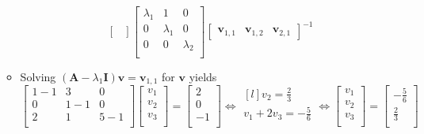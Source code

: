\documentclass[12pt,a4paper]{article}
\begin{document}
\begin{itemize}
\begin{itemize}
\begin{enumerate}
\begin{equation}
\begin{bmatrix}
        \end{bmatrix}
        \begin{bmatrix}
          \lambda_{1} & 1 & 0 \\
          0 & \lambda_{1} & 0 \\
          0 & 0 & \lambda_{2} \\
        \end{bmatrix}
        \begin{bmatrix}
          \bm{v}_{1,1} & \bm{v}_{1,2} & \bm{v}_{2,1}
        \end{bmatrix}^{-1}
      \end{equation}
    \end{enumerate}
  \item Solving $(\bm{A}-\lambda_{1}\bm{I})\bm{v} = \bm{v}_{1,1}$ for $\bm{v}$ yields
    \begin{equation}\nonumber%
      \begin{bmatrix}
        1-1 & 3 & 0 \\
        0 & 1-1 & 0 \\
        2 & 1 & 5-1 \\
      \end{bmatrix}
      \begin{bmatrix}
        v_{1} \\
        v_{2} \\
        v_{3} \\
      \end{bmatrix}
      =
      \begin{bmatrix}
        2 \\
        0 \\
        -1 \\
      \end{bmatrix}
      \iff
      \begin{matrix*}[l]
        v_{2} = \frac{2}{3}  \\
        v_{1} + 2v_{3} = - \frac{5}{6} \\
      \end{matrix*}
      \iff
      \begin{bmatrix}
        v_{1} \\
        v_{2} \\
        v_{3} \\
      \end{bmatrix}
      =
      \begin{bmatrix}
        - \frac{5}{6} \\
        \frac{2}{3} \\

\end{bmatrix}
\end{equation}
\end{itemize}
\end{itemize}
\end{document}
